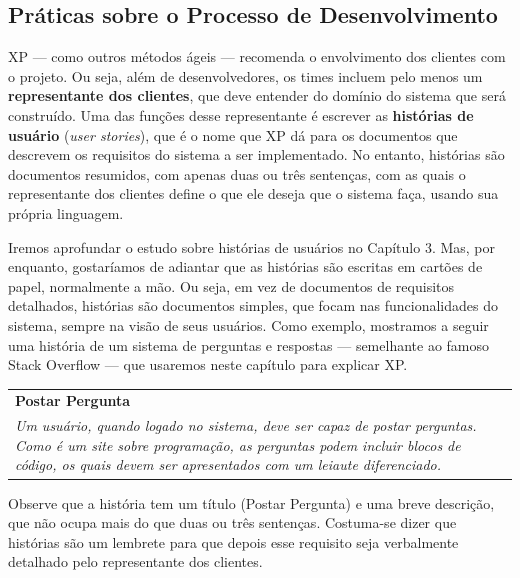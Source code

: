 \documentclass[
  11pt,
  twoside]{book}
\begin{document}
\hypertarget{pruxe1ticas-sobre-o-processo-de-desenvolvimento}{%
\subsection{Práticas sobre o Processo de
Desenvolvimento}\label{pruxe1ticas-sobre-o-processo-de-desenvolvimento}}

 XP --- como outros métodos ágeis ---
recomenda o envolvimento dos clientes com o projeto. Ou seja, além de
desenvolvedores, os times incluem pelo menos um \textbf{representante
dos clientes}, que deve entender do domínio do sistema que será
construído. Uma das funções desse representante é escrever as
\textbf{histórias de usuário} (\emph{user stories}), que é o nome que XP
dá para os documentos que descrevem os requisitos do sistema a ser
implementado. No entanto, histórias são documentos resumidos, com apenas
duas ou três sentenças, com as quais o representante dos clientes define
o que ele deseja que o sistema faça, usando sua própria linguagem.

Iremos aprofundar o estudo sobre histórias de usuários no Capítulo 3.
Mas, por enquanto, gostaríamos de adiantar que as histórias são escritas
em cartões de papel, normalmente a mão. Ou seja, em vez de documentos de
requisitos detalhados, histórias são documentos simples, que focam nas
funcionalidades do sistema, sempre na visão de seus usuários. Como
exemplo, mostramos a seguir uma história de um sistema de perguntas e
respostas --- semelhante ao famoso Stack Overflow --- que usaremos neste
capítulo para explicar XP.

\begin{longtable}[]{@{}l@{}}
\toprule
\endhead
\begin{minipage}[t]{0.88\columnwidth}\raggedright
\textbf{Postar Pergunta}\strut
\end{minipage}\tabularnewline
\begin{minipage}[t]{0.88\columnwidth}\raggedright
\emph{Um usuário, quando logado no sistema, deve ser capaz de postar
perguntas. Como é um site sobre programação, as perguntas podem incluir
blocos de código, os quais devem ser apresentados com um leiaute
diferenciado.}\strut
\end{minipage}\tabularnewline
\bottomrule
\end{longtable}

Observe que a história tem um título (Postar Pergunta) e uma breve
descrição, que não ocupa mais do que duas ou três sentenças. Costuma-se
dizer que histórias são um lembrete para que depois esse requisito seja
verbalmente detalhado pelo representante dos clientes.
\end{document}
